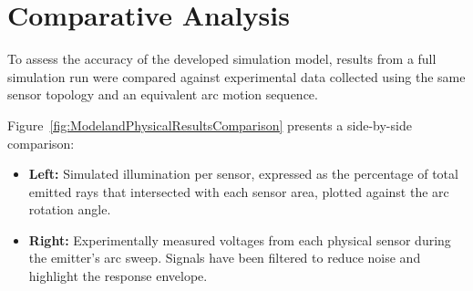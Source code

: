 \section{Comparative Analysis}

To assess the accuracy of the developed simulation model, results from a full simulation run were compared against experimental data collected using the same sensor topology and an equivalent arc motion sequence.

Figure~\ref{fig:ModelandPhysicalResultsComparison} presents a side-by-side comparison:
\begin{itemize}
    \item \textbf{Left:} Simulated illumination per sensor, expressed as the percentage of total emitted rays that intersected with each sensor area, plotted against the arc rotation angle.
    \item \textbf{Right:} Experimentally measured voltages from each physical sensor during the emitter's arc sweep. Signals have been filtered to reduce noise and highlight the response envelope.
\end{itemize}
